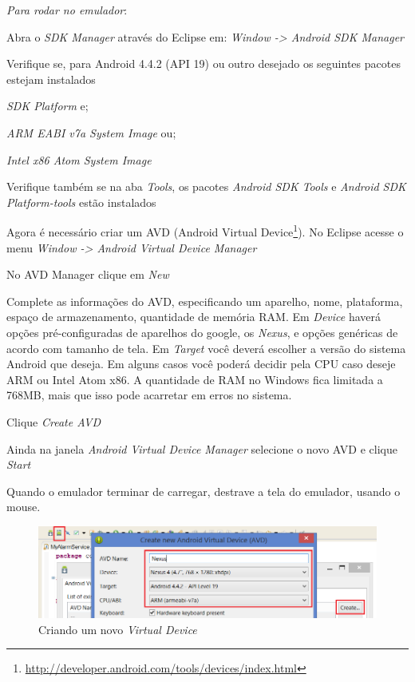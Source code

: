 \documentclass[a4paper,12pt,brazil,oneside]{book}
\begin{document}
\newpage 

\emph{Para rodar no emulador}:

\be
\item Abra o \textit{SDK Manager} através do Eclipse em: \textit{Window -> Android SDK Manager}
\item Verifique se, para Android 4.4.2 (API 19) ou outro desejado os seguintes pacotes estejam instalados
	\bi
	\item \textit{SDK Platform} e;
	\item \textit{ARM EABI v7a System Image} ou;
	\item \textit{Intel x86 Atom System Image}
	\ei
\item Verifique também se na aba \textit{Tools}, os pacotes \textit{Android SDK Tools} e \textit{Android SDK Platform-tools} estão instalados
\item Agora é necessário criar um AVD (Android Virtual Device\footnote{\href{http://developer.android.com/tools/devices/index.html}{http://developer.android.com/tools/devices/index.html}}). No Eclipse acesse o menu \textit{Window -> Android Virtual Device Manager} 
\item No AVD Manager clique em \emph{New}
\item Complete as informações do AVD, especificando um aparelho, nome, plataforma, espaço de armazenamento, quantidade de memória RAM. Em \emph{Device} haverá opções pré-configuradas de aparelhos do google, os \emph{Nexus}, e opções genéricas de acordo com tamanho de tela. Em \emph{Target} você deverá escolher a versão do sistema Android que deseja. Em alguns casos você poderá decidir pela CPU caso deseje ARM ou Intel Atom x86. A quantidade de RAM no Windows fica limitada a 768MB, mais que isso pode acarretar em erros no sistema.

\item Clique \emph{Create AVD}
\item Ainda na janela \emph{Android Virtual Device Manager} selecione o novo AVD e clique \emph{Start}
\item Quando o emulador terminar de carregar, destrave a tela do emulador, usando o mouse.
\ee


\begin{figure}[H]
  \centering
  \includegraphics[width=.7\textwidth]{figuras/emulador/AddEmulador1.png}
  \caption{Criando um novo \emph{Virtual Device}}
  \label{fig:AddEmulador1}
\end{figure}
\end{document}

